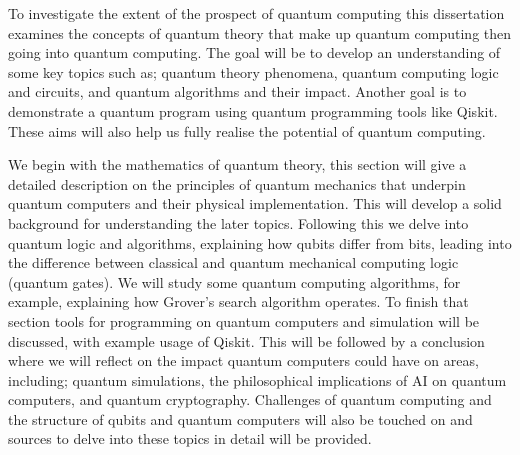 \noindent To investigate the extent of the prospect of quantum computing this dissertation examines the concepts of quantum theory that make up quantum computing then going into quantum computing. The goal will be to develop an understanding of some key topics such as; quantum theory phenomena, quantum computing logic and circuits, and quantum algorithms and their impact. Another goal is to demonstrate a quantum program using quantum programming tools like Qiskit. These aims will also help us fully realise the potential of quantum computing.

\noindent We begin with the mathematics of quantum theory, this section will give a detailed description on the principles of quantum mechanics that underpin quantum computers and their physical implementation. This will develop a solid background for understanding the later topics. Following this we delve into quantum logic and algorithms, explaining how qubits differ from bits, leading into the difference between classical and quantum mechanical computing logic (quantum gates). We will study some quantum computing algorithms, for example, explaining how Grover's search algorithm operates. To finish that section tools for programming on quantum computers and simulation will be discussed, with example usage of Qiskit. This will be followed by a conclusion where we will reflect on the impact quantum computers could have on areas, including; quantum simulations, the philosophical implications of AI on quantum computers, and quantum cryptography. Challenges of quantum computing and the structure of qubits and quantum computers will also be touched on and sources to delve into these topics in detail will be provided. 


